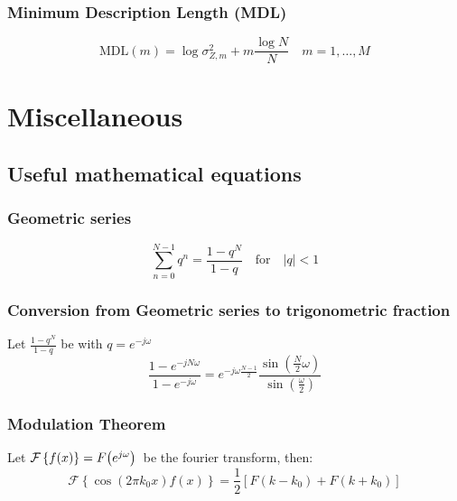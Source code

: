 \documentclass[accentcolor=tud4c,9.5pt,nochapname,bigchapter,paper=a5report]{tudreport}
\begin{document}
\subsection{Minimum Description Length (MDL)}
\begin{equation}
\text{MDL}(m)=\log \sigma_{Z,m}^2 + m\frac{\log N}{N} \quad m=1,\ldots,M
\end{equation}
\chapter{Miscellaneous}
\section{Useful mathematical equations}
\subsection{Geometric series}
\begin{equation}
\sum\limits_{n=0}^{N-1} q^n = \frac{1-q^N}{1-q} \quad \text{for} \quad|q|<1
\end{equation} 



\subsection{Conversion from Geometric series to trigonometric fraction} \label{geomconv}
Let $\frac{1-q^{N}}{1-q}$ be with $q = e^{-j\omega}$
\begin{equation}
\frac{1-e^{-jN\omega}}{1-e^{-j\omega}} = e^{-j\omega \frac{N-1}{2}}\frac{\sin\left(\frac{N}{2}\omega\right)}{\sin\left(\frac{\omega}{2}\right)}
\end{equation}

\subsection{Modulation Theorem}
Let $\mathcal{F}\left\{f(x)\right\}=F{\left(e^{j\omega}\right)}\,$ be the fourier transform, then:
\begin{equation}
\mathcal{F}\left\{\cos(2\pi k_0 x)f(x)\right\} = \frac{1}{2}\left[F(k-k_0)+F(k+k_0)\right]
\end{equation}
\end{document}
